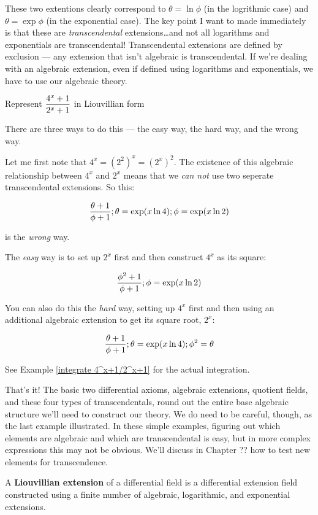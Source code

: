 These two extentions clearly correspond to $\theta = \ln\phi$ (in the
logrithmic case) and $\theta = \exp\phi$ (in the exponential case).
The key point I want to made immediately is that these are {\it
transcendental} extensions\ldots and not all logarithms and
exponentials are transcendental!  Transcendental extensions are
defined by exclusion --- any extension that isn't algebraic is
transcendental.  If we're dealing with an algebraic extension, even if
defined using logarithms and exponentials, we have to use our
algebraic theory.

\example Represent $\displaystyle {{4^x+1}\over{2^x+1}}$ in Liouvillian form\label{represent 4^x+1/2^x+1}

There are three ways to do this --- the easy way, the hard way, and
the wrong way.

Let me first note that $4^x = (2^2)^x = (2^x)^2$.  The existence of
this algebraic relationship between $4^x$ and $2^x$ means that we {\it
can not} use two seperate transcendental extensions.  So this:

$${{\theta+1}\over{\phi+1}}; \theta = \exp(x \ln 4); \phi = \exp(x \ln 2)$$

is the {\it wrong} way.

The {\it easy} way is to set up $2^x$ first and then construct $4^x$
as its square:

$${{\phi^2+1}\over{\phi+1}}; \phi = \exp(x \ln 2)$$

You can also do this the {\it hard} way, setting up $4^x$ first and
then using an additional algebraic extension to get its square root,
$2^x$:

$${{\theta+1}\over{\phi+1}}; \theta = \exp(x \ln 4); \phi^2 = \theta$$

See Example \ref{integrate 4^x+1/2^x+1} for the actual integration.

\endexample

That's it!  The basic two differential axioms, algebraic extensions,
quotient fields, and these four types of transcendentals, round out
the entire base algebraic structure we'll need to construct our
theory.  We do need to be careful, though, as the last example
illustrated.  In these simple examples, figuring out which elements
are algebraic and which are transcendental is easy, but in more
complex expressions this may not be obvious.  We'll discuss in Chapter
?? how to test new elements for transcendence.


A {\bf Liouvillian extension} of a differential field
is a differential extension field constructed using
a finite number of algebraic, logarithmic, and
exponential extensions.

